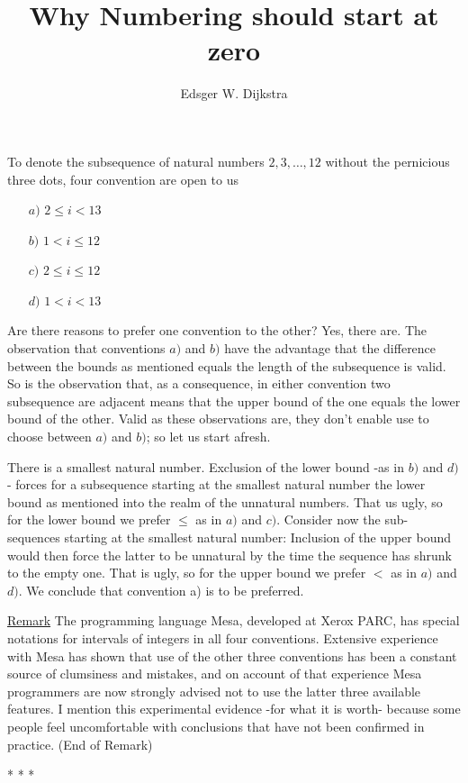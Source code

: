 \documentclass[a4paper,11pt]{article}
\title{Why Numbering should start at zero}
\author{Edsger W. Dijkstra}
\date{}
\begin{document}
\maketitle

To denote the subsequence of natural numbers $2,3,\ldots, 12$ without the pernicious three dots, four convention are open to us
\begin{enumerate}
\item [$a)$] $2 \leq i < 13$
\item [$b)$] $1 < i \leq 12$
\item [$c)$] $2 \leq i \leq 12$
\item [$d)$] $1 < i < 13$
\end{enumerate}
Are there reasons to prefer one convention to the other? Yes, there are. The observation that conventions $a)$ and $b)$ have the advantage that the difference between the bounds as mentioned equals the length of the subsequence is valid. So is the observation that, as a consequence, in either convention two subsequence are adjacent means that the upper bound of the one equals the lower bound of the other. Valid as these observations are, they don't enable use to choose between $a)$ and $b)$; so let us start afresh.

There is a smallest natural number. Exclusion of the lower bound -as in $b)$ and $d)$- forces for a subsequence starting at the smallest natural number the lower bound as mentioned into the realm of the unnatural numbers. That us ugly, so for the lower bound we prefer $\leq$ as in $a)$ and $c)$. Consider now the sub-sequences starting at the smallest natural number: Inclusion of the upper bound would then force the latter to be unnatural by the time the sequence has shrunk to the empty one. That is ugly, so for the upper bound we prefer $<$ as in $a)$ and $d)$. We conclude that convention a) is to be preferred.

\underline{Remark} The programming language Mesa, developed at Xerox PARC, has special notations for intervals of integers in all four conventions. Extensive experience with Mesa has shown that use of the other three conventions has been a constant source of clumsiness and mistakes, and on account of that experience Mesa programmers are now strongly advised not to use the latter three available features. I mention this experimental evidence -for what it is worth- because some people feel uncomfortable with conclusions that have not been confirmed in practice. (End of Remark)
\begin{center}
*    *    *
\end{center}
\end{document}
